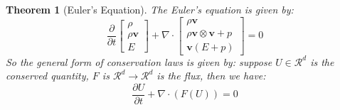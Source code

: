 \documentclass{article}
\newtheorem{theorem}{Theorem}
\begin{document}
\begin{theorem}[Euler's Equation]
    The Euler's equation is given by:
    \begin{equation}
        \frac{\partial}{\partial t}\begin{bmatrix}
        \rho\\ \rho \mathbf{v}\\E
    \end{bmatrix}
    + \nabla\cdot \begin{bmatrix}
        \rho \mathbf{v}\\ \rho \mathbf{v}\otimes \mathbf{v} + p\\ \mathbf{v}(E + p)
    \end{bmatrix} = 0
\end{equation}
So the general form of conservation laws is given by: suppose $U\in \mathcal{R}^d$ is the conserved quantity, $F$ is $\mathcal{R}^d\to \mathcal{R}^d$ is the flux, 
then we have:
\begin{equation}
    \frac{\partial U}{\partial t} + \nabla\cdot \left(F(U)\right) = 0
\end{equation}

\end{theorem}
\end{document}
